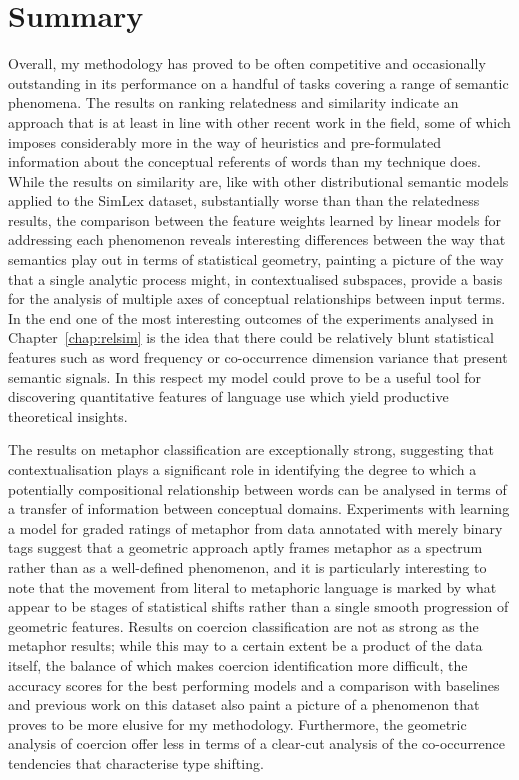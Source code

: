 \section{Summary}
Overall, my methodology has proved to be often competitive and occasionally outstanding in its performance on a handful of tasks covering a range of semantic phenomena.  The results on ranking relatedness and similarity indicate an approach that is at least in line with other recent work in the field, some of which imposes considerably more in the way of heuristics and pre-formulated information about the conceptual referents of words than my technique does.  While the results on similarity are, like with other distributional semantic models applied to the SimLex dataset, substantially worse than than the relatedness results, the comparison between the feature weights learned by linear models for addressing each phenomenon reveals interesting differences between the way that semantics play out in terms of statistical geometry, painting a picture of the way that a single analytic process might, in contextualised subspaces, provide a basis for the analysis of multiple axes of conceptual relationships between input terms.  In the end one of the most interesting outcomes of the experiments analysed in Chapter~\ref{chap:relsim} is the idea that there could be relatively blunt statistical features such as word frequency or co-occurrence dimension variance that present semantic signals.  In this respect my model could prove to be a useful tool for discovering quantitative features of language use which yield productive theoretical insights.

The results on metaphor classification are exceptionally strong, suggesting that contextualisation plays a significant role in identifying the degree to which a potentially compositional relationship between words can be analysed in terms of a transfer of information between conceptual domains.  Experiments with learning a model for graded ratings of metaphor from data annotated with merely binary tags suggest that a geometric approach aptly frames metaphor as a spectrum rather than as a well-defined phenomenon, and it is particularly interesting to note that the movement from literal to metaphoric language is marked by what appear to be stages of statistical shifts rather than a single smooth progression of geometric features.  Results on coercion classification are not as strong as the metaphor results; while this may to a certain extent be a product of the data itself, the balance of which makes coercion identification more difficult, the accuracy scores for the best performing models and a comparison with baselines and previous work on this dataset also paint a picture of a phenomenon that proves to be more elusive for my methodology.  Furthermore, the geometric analysis of coercion offer less in terms of a clear-cut analysis of the co-occurrence tendencies that characterise type shifting.

